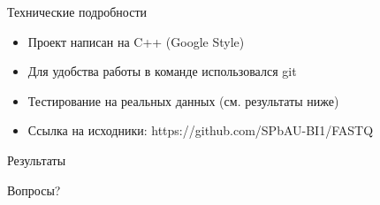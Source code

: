 \documentclass[12pt]{beamer}
\begin{document}
\begin{frame}{Технические подробности}

    \begin{itemize}
    
        \item <1-> Проект написан на C++ (Google Style)

        \item <2-> Для удобства работы в команде использовался git

        \item <3-> Тестирование на реальных данных (см. результаты ниже)

        \item <4-> Ссылка на исходники: https://github.com/SPbAU-BI1/FASTQ

    \end{itemize}

\end{frame}

\begin{frame}[fragile]{Результаты}
    
\end{frame}

\begin{frame}{}

    Вопросы?

\end{frame}
\end{document}
